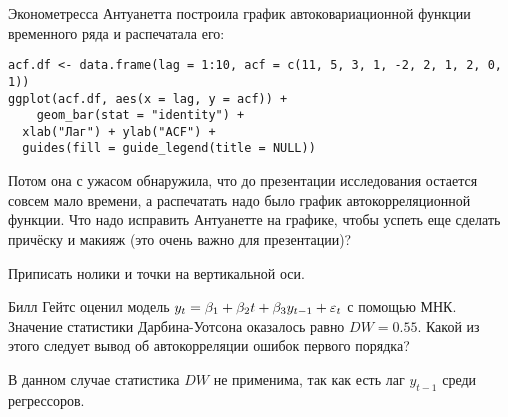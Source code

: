 \begin{problem}
Эконометресса Антуанетта построила график автоковариационной функции временного ряда и распечатала его:

\begin{verbatim}
acf.df <- data.frame(lag = 1:10, acf = c(11, 5, 3, 1, -2, 2, 1, 2, 0, 1))
ggplot(acf.df, aes(x = lag, y = acf)) +
    geom_bar(stat = "identity") +
  xlab("Лаг") + ylab("ACF") +
  guides(fill = guide_legend(title = NULL))
\end{verbatim}

\begin{minipage}{0.6\textwidth}
\begin{center}
\begin{tikzpicture}[scale = 0.025]

\end{tikzpicture}
\end{center}
\end{minipage}


Потом она с ужасом обнаружила, что до презентации исследования остается совсем мало времени, а распечатать надо было график автокорреляционной функции. Что надо исправить Антуанетте на графике, чтобы успеть еще сделать причёску и макияж (это очень важно для презентации)?


\begin{sol}
Приписать нолики и точки на вертикальной оси.
\end{sol}
\end{problem}


\begin{problem}
Билл Гейтс оценил модель $y_t=\beta_1 + \beta_2 t + \beta_3 y_{t-1} + \e_t$ с помощью МНК. Значение статистики Дарбина-Уотсона оказалось равно $DW=0.55$. Какой из этого следует вывод об автокорреляции ошибок первого порядка?


\begin{sol}
В данном случае статистика $DW$ не применима, так как есть лаг $y_{t-1}$ среди регрессоров.
\end{sol}
\end{problem}

